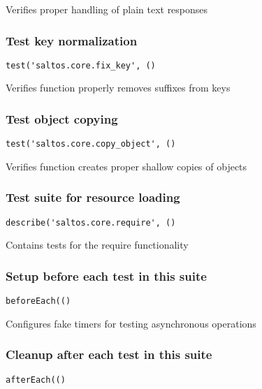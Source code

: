 \documentclass[a4paper]{article}
\begin{document}
Verifies proper handling of plain text responses

\hypertarget{toc82}{}
\subsubsection{Test key normalization}

\begin{lstlisting}
test('saltos.core.fix_key', ()
\end{lstlisting}

Verifies function properly removes suffixes from keys

\hypertarget{toc83}{}
\subsubsection{Test object copying}

\begin{lstlisting}
test('saltos.core.copy_object', ()
\end{lstlisting}

Verifies function creates proper shallow copies of objects

\hypertarget{toc84}{}
\subsubsection{Test suite for resource loading}

\begin{lstlisting}
describe('saltos.core.require', ()
\end{lstlisting}

Contains tests for the require functionality

\hypertarget{toc85}{}
\subsubsection{Setup before each test in this suite}

\begin{lstlisting}
beforeEach(()
\end{lstlisting}

Configures fake timers for testing asynchronous operations

\hypertarget{toc86}{}
\subsubsection{Cleanup after each test in this suite}

\begin{lstlisting}
afterEach(()
\end{lstlisting}
\end{document}
